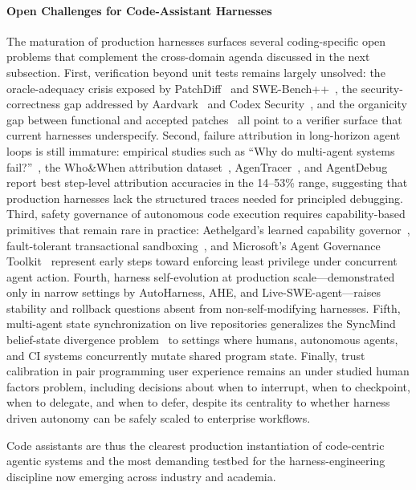 \paragraph{Open Challenges for Code-Assistant Harnesses}
The maturation of production harnesses surfaces several coding-specific open problems that complement the cross-domain agenda discussed in the next subsection.
First, verification beyond unit tests remains largely unsolved: the oracle-adequacy crisis exposed by PatchDiff~\citep{wang2025solved} and SWE-Bench++~\citep{anonymous2025swebenchpp}, the security-correctness gap addressed by Aardvark~\citep{openai2025aardvark} and Codex Security~\citep{openai2026codexsecurity}, and the organicity gap between functional and accepted patches~\citep{li2026learning,thillen2026codetaste} all point to a verifier surface that current harnesses underspecify.
Second, failure attribution in long-horizon agent loops is still immature: empirical studies such as ``Why do multi-agent systems fail?''~\citep{cemri2025whymas}, the Who\&When attribution dataset~\citep{zhang2025whoandwhen}, AgenTracer~\citep{agentracer2025}, and AgentDebug~\citep{zhu2025llm} report best step-level attribution accuracies in the 14--53\% range, suggesting that production harnesses lack the structured traces needed for principled debugging.
Third, safety governance of autonomous code execution requires capability-based primitives that remain rare in practice: Aethelgard's learned capability governor~\citep{anonymous2026aethelgard}, fault-tolerant transactional sandboxing~\citep{anonymous2025faultsandbox}, and Microsoft's Agent Governance Toolkit~\citep{microsoft2026governance} represent early steps toward enforcing least privilege under concurrent agent action.
Fourth, harness self-evolution at production scale---demonstrated only in narrow settings by AutoHarness, AHE, and Live-SWE-agent---raises stability and rollback questions absent from non-self-modifying harnesses.
Fifth, multi-agent state synchronization on live repositories generalizes the SyncMind belief-state divergence problem~\citep{Guo2025SyncMind} to settings where humans, autonomous agents, and CI systems concurrently mutate shared program state.
Finally, trust calibration in pair programming user experience remains an under studied human factors problem, including decisions about when to interrupt, when to checkpoint, when to delegate, and when to defer, despite its centrality to whether harness driven autonomy can be safely scaled to enterprise workflows.

Code assistants are thus the clearest production instantiation of code-centric agentic systems and the most demanding testbed for the harness-engineering discipline now emerging across industry and academia.


